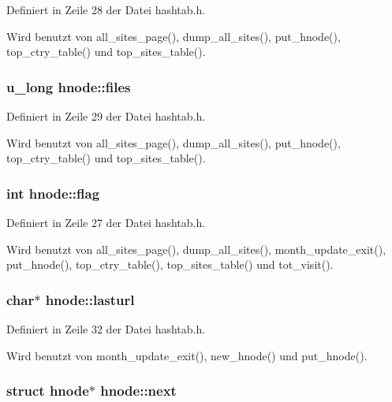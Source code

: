 Definiert in Zeile 28 der Datei hashtab.h.

Wird benutzt von all\_\-sites\_\-page(), dump\_\-all\_\-sites(), put\_\-hnode(), top\_\-ctry\_\-table() und top\_\-sites\_\-table().
\subsubsection{\setlength{\rightskip}{0pt plus 5cm}u\_\-long {\bf hnode::files}}\label{structhnode_afa2fd08fe9e22e6f183759b01a0e5c4}




Definiert in Zeile 29 der Datei hashtab.h.

Wird benutzt von all\_\-sites\_\-page(), dump\_\-all\_\-sites(), put\_\-hnode(), top\_\-ctry\_\-table() und top\_\-sites\_\-table().
\subsubsection{\setlength{\rightskip}{0pt plus 5cm}int {\bf hnode::flag}}\label{structhnode_821441b6ed6dd23ac11a37d932461b03}




Definiert in Zeile 27 der Datei hashtab.h.

Wird benutzt von all\_\-sites\_\-page(), dump\_\-all\_\-sites(), month\_\-update\_\-exit(), put\_\-hnode(), top\_\-ctry\_\-table(), top\_\-sites\_\-table() und tot\_\-visit().
\subsubsection{\setlength{\rightskip}{0pt plus 5cm}char$\ast$ {\bf hnode::lasturl}}\label{structhnode_d025a4c0d49fa093181202d2a91eb524}




Definiert in Zeile 32 der Datei hashtab.h.

Wird benutzt von month\_\-update\_\-exit(), new\_\-hnode() und put\_\-hnode().
\subsubsection{\setlength{\rightskip}{0pt plus 5cm}struct {\bf hnode}$\ast$ {\bf hnode::next}}\label{structhnode_da1ebcc2a224afb85778f07ff89c9e23}




